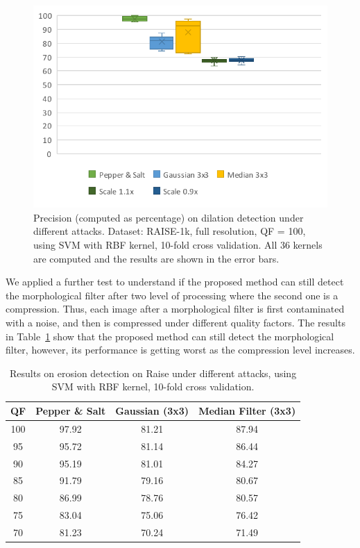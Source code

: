 \documentclass{ieeeaccess}
\begin{document}
\begin{figure}[t!]
	\centering
	\includegraphics[width=\linewidth]{attacks_1.pdf}
	\caption{Precision (computed as percentage) on dilation detection under different attacks. Dataset: RAISE-1k, full resolution, QF = 100, using SVM with RBF kernel, 10-fold cross validation. All 36 kernels are computed and the results are shown in the error bars.}
	\label{fig:attacks_1}
\end{figure}

We applied a further test to understand if the proposed method can still detect the morphological filter after two level of processing where the second one is a compression. Thus, each image after a morphological filter is first contaminated with a noise, and then is compressed under different quality factors.  The results in Table~\ref{table:attacks2} show that the proposed method can still detect the morphological filter, however, its performance is getting worst as the compression level increases.  

\begin{table}[t!]
	\centering
	\caption{Results on erosion detection on Raise under different attacks, using SVM with RBF kernel, 10-fold cross validation.}
	\label{table:attacks2}
	\begin{tabular}{c|ccc}
		\hline\hline
		\textbf{QF} & \textbf{Pepper \& Salt}&\textbf{Gaussian (3x3)}&\textbf{Median Filter (3x3)}\\
		\hline
		100&97.92&81.21&87.94\\
		95&95.72&81.14&86.44\\
		90&95.19&81.01&84.27\\
		85&91.79&79.16&80.67\\
		80&86.99&78.76&80.57\\
		75&83.04&75.06&76.42\\
		70&81.23&70.24&71.49\\
		\hline\hline	
	\end{tabular}
\end{table}
\end{document}
